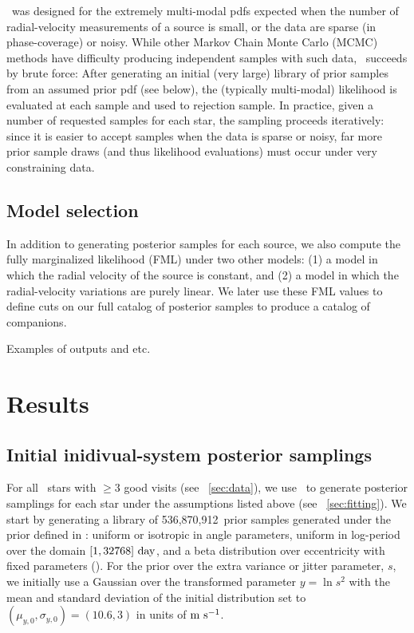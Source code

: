\documentclass[modern, letterpaper]{aastex62}
\newcommand{\apogee}{\project{\acronym{APOGEE}}}
\newcommand{\thejoker}{\project{The~Joker}}
\newcommand{\nprior}{536,870,912}
\begin{document}
\thejoker\ was designed for the extremely multi-modal pdfs expected when the
number of radial-velocity measurements of a source is small, or the data are
sparse (in phase-coverage) or noisy.
While other Markov Chain Monte Carlo (MCMC) methods have difficulty producing
independent samples with such data, \thejoker\ succeeds by brute force:
After generating an initial (very large) library of prior samples from an
assumed prior pdf (see below), the (typically multi-modal) likelihood is
evaluated at each sample and used to rejection sample.
In practice, given a number of requested samples for each star, the sampling
proceeds iteratively: since it is easier to accept samples when the data is
sparse or noisy, far more prior sample draws (and thus likelihood evaluations)
must occur under very constraining data.

\subsection{Model selection}

In addition to generating posterior samples for each source, we also compute the
fully marginalized likelihood (FML) under two other models: (1) a model in which
the radial velocity of the source is constant, and (2) a model in which the
radial-velocity variations are purely linear.
We later use these FML values to define cuts on our full catalog of posterior
samples to produce a catalog of companions.


Examples of outputs and etc.

\section{Results}

\subsection{Initial inidivual-system posterior samplings}
\label{sec:initsampling}

For all  \apogee\ stars with $\geq 3$ good visits (see
\sectionname~\ref{sec:data}), we use \thejoker\ to generate posterior samplings
for each star under the assumptions listed above (see
\sectionname~\ref{sec:fitting}).
We start by generating a library of \nprior\ prior samples generated under the
prior defined in \citet{Price-Whelan:2017}: uniform or isotropic in angle
parameters, uniform in log-period over the domain $[1, 32768]~{\rm day}$, and a
beta distribution over eccentricity with fixed parameters
(\citealt{Kipping:2013}).
For the prior over the extra variance or jitter parameter, $s$, we initially use
a Gaussian over the transformed parameter $y = \ln s^2$ with the mean and
standard deviation of the initial distribution set to $(\mu_{y,0}, \sigma_{y,0})
= (10.6, 3)$ in units of ${\rm m}~{\rm s}^{-1}$.
\end{document}
